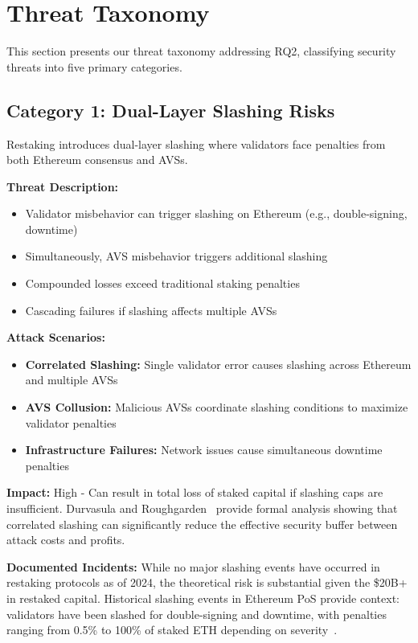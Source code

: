 \documentclass[runningheads]{llncs}
\begin{document}
\vspace{-0.3cm}
\section{Threat Taxonomy}
\label{sec:threats}

This section presents our threat taxonomy addressing RQ2, classifying security threats into five primary categories.

\subsection{Category 1: Dual-Layer Slashing Risks}

Restaking introduces dual-layer slashing where validators face penalties from both Ethereum consensus and AVSs.

\textbf{Threat Description:}
\begin{itemize}
    \item Validator misbehavior can trigger slashing on Ethereum (e.g., double-signing, downtime)
    \item Simultaneously, AVS misbehavior triggers additional slashing
    \item Compounded losses exceed traditional staking penalties
    \item Cascading failures if slashing affects multiple AVSs
\end{itemize}

\textbf{Attack Scenarios:}
\begin{itemize}
    \item \textbf{Correlated Slashing:} Single validator error causes slashing across Ethereum and multiple AVSs
    \item \textbf{AVS Collusion:} Malicious AVSs coordinate slashing conditions to maximize validator penalties
    \item \textbf{Infrastructure Failures:} Network issues cause simultaneous downtime penalties
\end{itemize}

\textbf{Impact:} High - Can result in total loss of staked capital if slashing caps are insufficient. Durvasula and Roughgarden~\cite{durvasula2024robust} provide formal analysis showing that correlated slashing can significantly reduce the effective security buffer between attack costs and profits.

\textbf{Documented Incidents:}
While no major slashing events have occurred in restaking protocols as of 2024, the theoretical risk is substantial given the \$20B+ in restaked capital. Historical slashing events in Ethereum PoS provide context: validators have been slashed for double-signing and downtime, with penalties ranging from 0.5\% to 100\% of staked ETH depending on severity~\cite{ethereum2024staking}.
\end{document}

